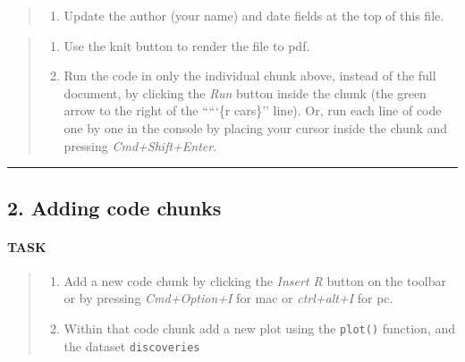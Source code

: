 \documentclass[]{article}
\providecommand{\tightlist}{%
  \setlength{\itemsep}{0pt}\setlength{\parskip}{0pt}}
\let\oldparagraph\paragraph
\renewcommand{\paragraph}[1]{\oldparagraph{#1}\mbox{}}
\begin{document}
\begin{quote}
\begin{enumerate}
\def\labelenumi{\arabic{enumi}.}
\tightlist
\item
  Update the author (your name) and date fields at the top of this file.
\end{enumerate}
\end{quote}

\begin{quote}
\begin{enumerate}
\def\labelenumi{\arabic{enumi}.}
\setcounter{enumi}{1}
\tightlist
\item
  Use the knit button to render the file to pdf.\\
\item
  Run the code in only the individual chunk above, instead of the full
  document, by clicking the \emph{Run} button inside the chunk (the
  green arrow to the right of the `````\{r cars\}'' line). Or, run each
  line of code one by one in the console by placing your cursor inside
  the chunk and pressing \emph{Cmd+Shift+Enter}.
\end{enumerate}
\end{quote}

\begin{center}\rule{0.5\linewidth}{\linethickness}\end{center}

\hypertarget{adding-code-chunks}{%
\subsection{2. Adding code chunks}\label{adding-code-chunks}}

\hypertarget{task-1}{%
\paragraph{TASK}\label{task-1}}

\begin{quote}
\begin{enumerate}
\def\labelenumi{\arabic{enumi}.}
\setcounter{enumi}{3}
\tightlist
\item
  Add a new code chunk by clicking the \emph{Insert R} button on the
  toolbar or by pressing \emph{Cmd+Option+I} for mac or
  \emph{ctrl+alt+I} for pc.
\item
  Within that code chunk add a new plot using the \texttt{plot()}
  function, and the dataset \texttt{discoveries}
\end{enumerate}
\end{quote}
\end{document}
